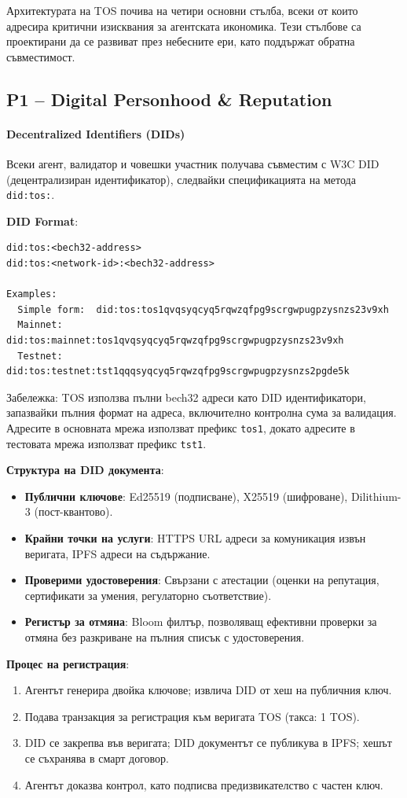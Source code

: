 \documentclass[11pt]{article}
\begin{document}
Архитектурата на TOS почива на четири основни стълба, всеки от които адресира критични изисквания за агентската икономика. Тези стълбове са проектирани да се развиват през небесните ери, като поддържат обратна съвместимост.

\subsection{P1 -- Digital Personhood \& Reputation}
\label{sec:pillar-identity}

\paragraph{Decentralized Identifiers (DIDs)}
Всеки агент, валидатор и човешки участник получава съвместим с W3C DID (децентрализиран идентификатор), следвайки спецификацията на метода \texttt{did:tos:}.

\textbf{DID Format}:
\begin{verbatim}
did:tos:<bech32-address>
did:tos:<network-id>:<bech32-address>

Examples:
  Simple form:  did:tos:tos1qvqsyqcyq5rqwzqfpg9scrgwpugpzysnzs23v9xh
  Mainnet:      did:tos:mainnet:tos1qvqsyqcyq5rqwzqfpg9scrgwpugpzysnzs23v9xh
  Testnet:      did:tos:testnet:tst1qqqsyqcyq5rqwzqfpg9scrgwpugpzysnzs2pgde5k
\end{verbatim}
Забележка: TOS използва пълни bech32 адреси като DID идентификатори, запазвайки пълния формат на адреса, включително контролна сума за валидация. Адресите в основната мрежа използват префикс \texttt{tos1}, докато адресите в тестовата мрежа използват префикс \texttt{tst1}.

\textbf{Структура на DID документа}:
\begin{itemize}[noitemsep]
  \item \textbf{Публични ключове}: Ed25519 (подписване), X25519 (шифроване), Dilithium-3 (пост-квантово).
  \item \textbf{Крайни точки на услуги}: HTTPS URL адреси за комуникация извън веригата, IPFS адреси на съдържание.
  \item \textbf{Проверими удостоверения}: Свързани с атестации (оценки на репутация, сертификати за умения, регулаторно съответствие).
  \item \textbf{Регистър за отмяна}: Bloom филтър, позволяващ ефективни проверки за отмяна без разкриване на пълния списък с удостоверения.
\end{itemize}

\textbf{Процес на регистрация}:
\begin{enumerate}[noitemsep]
  \item Агентът генерира двойка ключове; извлича DID от хеш на публичния ключ.
  \item Подава транзакция за регистрация към веригата TOS (такса: 1 TOS).
  \item DID се закрепва във веригата; DID документът се публикува в IPFS; хешът се съхранява в смарт договор.
  \item Агентът доказва контрол, като подписва предизвикателство с частен ключ.
\end{enumerate}
\end{document}
